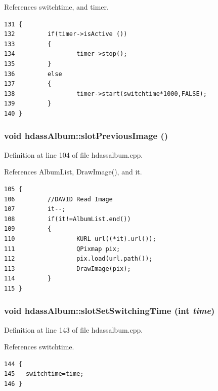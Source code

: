 References switchtime, and timer.



\footnotesize\begin{verbatim}131 {
132         if(timer->isActive ())
133         {
134                 timer->stop();
135         }
136         else
137         {
138                 timer->start(switchtime*1000,FALSE);
139         }
140 }
\end{verbatim}\normalsize 
{}
\subsubsection{\setlength{\rightskip}{0pt plus 5cm}void hdass\-Album::slot\-Previous\-Image ()\hspace{0.3cm}{\tt  [slot]}}\label{classhdassAlbum_ImageDetiali5}




Definition at line 104 of file hdassalbum.cpp.

References Album\-List, Draw\-Image(), and it.



\footnotesize\begin{verbatim}105 {
106         //DAVID Read Image
107         it--;
108         if(it!=AlbumList.end())
109         {
110                 KURL url((*it).url());
111                 QPixmap pix;
112                 pix.load(url.path());
113                 DrawImage(pix);
114         }
115 }
\end{verbatim}\normalsize 
{}
\subsubsection{\setlength{\rightskip}{0pt plus 5cm}void hdass\-Album::slot\-Set\-Switching\-Time (int {\em time})\hspace{0.3cm}{\tt  [slot]}}\label{classhdassAlbum_ImageDetiali8}




Definition at line 143 of file hdassalbum.cpp.

References switchtime.



\footnotesize\begin{verbatim}144 {
145   switchtime=time;
146 }
\end{verbatim}\normalsize 
{}
